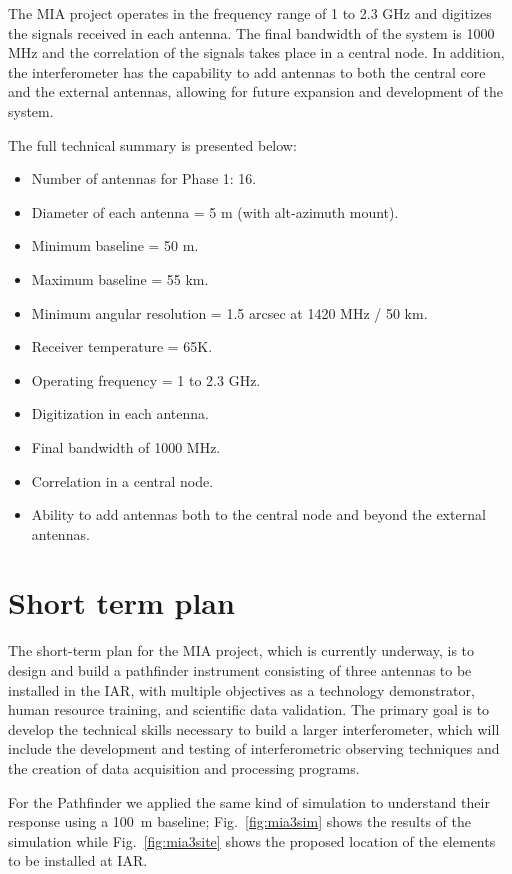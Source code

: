 \documentclass[baaa]{baaa}
\begin{document}
The MIA project operates in the frequency range of 1 to 2.3 GHz and digitizes the signals received in each antenna. The final bandwidth of the system is 1000 MHz and the correlation of the signals takes place in a central node. In addition, the interferometer has the capability to add antennas to both the central core and the external antennas, allowing for future expansion and development of the system.

The full technical summary is presented below:
\begin{itemize}
    \item Number of antennas for Phase 1: 16.
    \item Diameter of each antenna = 5 m (with alt-azimuth mount).
    \item Minimum baseline = 50 m.
    \item Maximum baseline = 55 km.
    \item Minimum angular resolution = 1.5 arcsec at 1420 MHz / 50 km.
    \item Receiver temperature = 65K.
    \item Operating frequency = 1 to 2.3 GHz.
    \item Digitization in each antenna.
    \item Final bandwidth of 1000 MHz.
    \item Correlation in a central node.
    \item Ability to add antennas both to the central node and beyond the external antennas.
\end{itemize}

\section{Short term plan}
\label{sec:plan}


The short-term plan for the MIA project, which is currently underway, is to design and build a pathfinder instrument consisting of three antennas to be installed in the IAR, with multiple objectives as a technology demonstrator, human resource training, and scientific data validation. The primary goal is to develop the technical skills necessary to build a larger interferometer, which will include the development and testing of interferometric observing techniques and the creation of data acquisition and processing programs.

 For the Pathfinder we applied the same kind of simulation to understand their response using a 100~m baseline; Fig.~\ref{fig:mia3sim} shows the results of the simulation while  Fig.~\ref{fig:mia3site} shows the proposed location of the elements to be installed at IAR.
\end{document}
